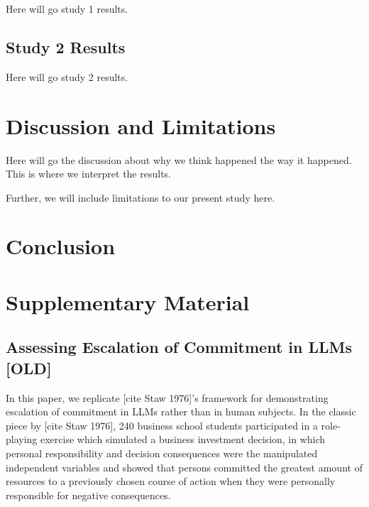 \documentclass{article}
\begin{document}
Here will go study 1 results.

\subsection{Study 2 Results}

Here will go study 2 results.

\section{Discussion and Limitations} 

Here will go the discussion about why we think happened the way it happened. This is where we interpret the results. 

Further, we will include limitations to our present study here.



\section{Conclusion}

\newpage




\newpage

\appendix

\section{Supplementary Material}

\subsection{Assessing Escalation of Commitment in LLMs [OLD]}

In this paper, we replicate [cite Staw 1976]'s framework for demonstrating escalation of commitment in LLMs rather than in human subjects. In the classic piece by [cite Staw 1976], 240 business school students participated in a role-playing exercise which simulated a business investment decision, in which personal responsibility and decision consequences were the manipulated independent variables and showed that persons committed the greatest amount of resources to a previously chosen course of action when they were personally responsible for negative consequences.
\end{document}
